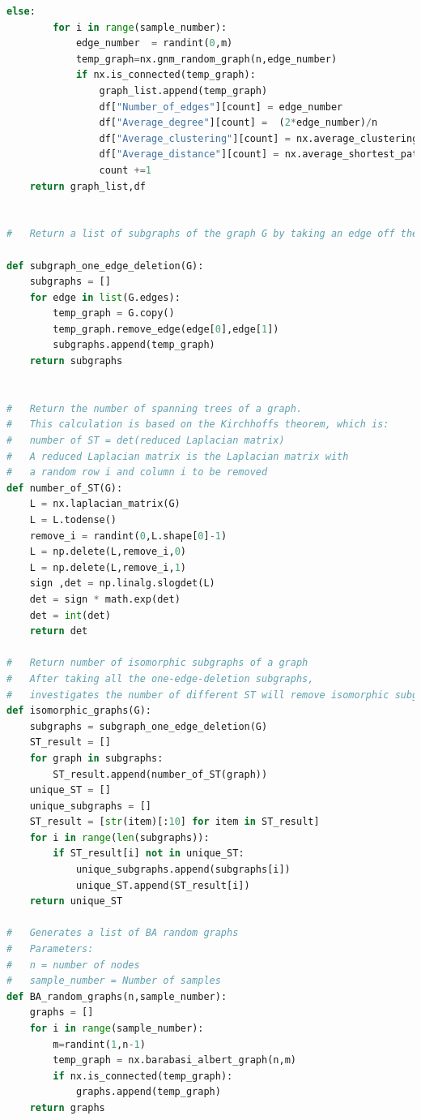 \documentclass[12pt]{article}
\begin{document}
\begin{lstlisting}[language=Python,breaklines=true]
    else:
        for i in range(sample_number):
            edge_number  = randint(0,m)
            temp_graph=nx.gnm_random_graph(n,edge_number)
            if nx.is_connected(temp_graph):
                graph_list.append(temp_graph)
                df["Number_of_edges"][count] = edge_number
                df["Average_degree"][count] =  (2*edge_number)/n
                df["Average_clustering"][count] = nx.average_clustering(temp_graph)
                df["Average_distance"][count] = nx.average_shortest_path_length(temp_graph)
                count +=1
    return graph_list,df


#   Return a list of subgraphs of the graph G by taking an edge off the graph

def subgraph_one_edge_deletion(G):
    subgraphs = []
    for edge in list(G.edges):
        temp_graph = G.copy()
        temp_graph.remove_edge(edge[0],edge[1])
        subgraphs.append(temp_graph)
    return subgraphs


#   Return the number of spanning trees of a graph.
#   This calculation is based on the Kirchhoffs theorem, which is:
#   number of ST = det(reduced Laplacian matrix)
#   A reduced Laplacian matrix is the Laplacian matrix with
#   a random row i and column i to be removed
def number_of_ST(G):
    L = nx.laplacian_matrix(G)
    L = L.todense()
    remove_i = randint(0,L.shape[0]-1)
    L = np.delete(L,remove_i,0)
    L = np.delete(L,remove_i,1)
    sign ,det = np.linalg.slogdet(L)
    det = sign * math.exp(det)
    det = int(det)
    return det

#   Return number of isomorphic subgraphs of a graph
#   After taking all the one-edge-deletion subgraphs,
#   investigates the number of different ST will remove isomorphic subgraphs
def isomorphic_graphs(G):
    subgraphs = subgraph_one_edge_deletion(G)
    ST_result = []
    for graph in subgraphs:
        ST_result.append(number_of_ST(graph))
    unique_ST = []
    unique_subgraphs = []
    ST_result = [str(item)[:10] for item in ST_result]
    for i in range(len(subgraphs)):
        if ST_result[i] not in unique_ST:
            unique_subgraphs.append(subgraphs[i])
            unique_ST.append(ST_result[i])
    return unique_ST

#   Generates a list of BA random graphs
#   Parameters:
#   n = number of nodes
#   sample_number = Number of samples
def BA_random_graphs(n,sample_number):
    graphs = []
    for i in range(sample_number):
        m=randint(1,n-1)
        temp_graph = nx.barabasi_albert_graph(n,m)
        if nx.is_connected(temp_graph):
            graphs.append(temp_graph)
    return graphs


\end{lstlisting}
\end{document}
